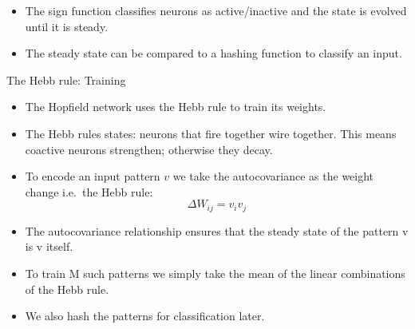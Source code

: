 \documentclass[
  ignorenonframetext,
]{beamer}
\begin{document}
\begin{frame}{}
\protect\hypertarget{section-2}{}
\begin{itemize}
\item
  The sign function classifies neurons as active/inactive and the state
  is evolved until it is steady.
\item
  The steady state can be compared to a hashing function to classify an
  input.
\end{itemize}
\end{frame}

\begin{frame}{The Hebb rule: Training}
\protect\hypertarget{the-hebb-rule-training}{}
\begin{itemize}
\item
  The Hopfield network uses the Hebb rule to train its weights.
\item
  The Hebb rules states: neurons that fire together wire together. This
  means coactive neurons strengthen; otherwise they decay.
\item
  To encode an input pattern \(v\) we take the autocovariance as the
  weight change i.e.~the Hebb rule: \[ \Delta W_{ij} = v_i v_j \]
\end{itemize}
\end{frame}

\begin{frame}{}
\protect\hypertarget{section-3}{}
\begin{itemize}
\item
  The autocovariance relationship ensures that the steady state of the
  pattern v is v itself.
\item
  To train M such patterns we simply take the mean of the linear
  combinations of the Hebb rule.
\item
  We also hash the patterns for classification later.
\end{itemize}
\end{frame}
\end{document}
